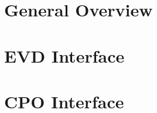 \section{General Overview}
\label{sec: general_overview}%


\section{EVD Interface}
\label{sec: evd_interface}%


\section{CPO Interface}
\label{sec: cpo_interface}%
